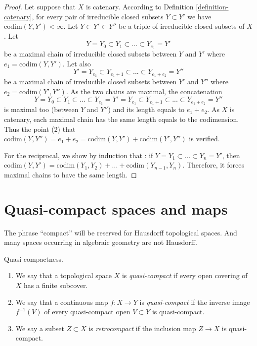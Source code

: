 \begin{proof}
Let suppose that $X$ is catenary. According to
Definition \ref{definition-catenary}, for every pair of
irreducible closed subsets $Y \subset Y'$ we have
$\text{codim}(Y,Y') < \infty$. Let $Y \subset Y' \subset Y''$
be a triple of irreducible closed subsets of $X$. Let
$$
Y = Y_0 \subset Y_1 \subset ... \subset Y_{e_1} = Y'
$$
be a maximal chain of irreducible closed subsets between $Y$ and $Y'$
where $e_1 = \text{codim}(Y,Y')$. Let also
$$
Y' = Y_{e_1} \subset Y_{e_1 + 1}\subset ... \subset Y_{e_1 + e_2} = Y''
$$
be a maximal chain of irreducible closed subsets between $Y'$
and $Y''$ where $e_2 = \text{codim}(Y',Y'')$.
As the two chains are maximal, the concatenation
$$
Y = Y_0\subset Y_1 \subset ... \subset Y_{e_1} = Y' =
Y_{e_1} \subset Y_{e_1+1}\subset ... \subset Y_{e_1+e_2}=Y''
$$
is maximal too (between $Y$ and $Y''$) and its length equals to $e_1 + e_2$.
As $X$ is catenary, each maximal chain has the same length equals to the
codimension. Thus the point (2) that
$\text{codim}(Y,Y'') = e_1 + e_2 = \text{codim}(Y,Y') + \text{codim}(Y',Y'')$
is verified.

\medskip\noindent
For the reciprocal, we show by induction that : if $Y = Y_1 \subset ... \subset
Y_n = Y'$, then $ \text{codim}(Y,Y') = \text{codim}(Y_1,Y_2) + ... +
\text{codim}(Y_{n-1},Y_n)$. Therefore, it forces maximal chains to have the
same length.
\end{proof}







\section{Quasi-compact spaces and maps}
\label{section-quasi-compact}

\noindent
The phrase ``compact'' will be reserved
for Hausdorff topological spaces. And many spaces occurring
in algebraic geometry are not Hausdorff.

\begin{definition}
\label{definition-quasi-compact}
Quasi-compactness.
\begin{enumerate}
\item We say that a topological space $X$ is {\it quasi-compact}
if every open covering of $X$ has a finite subcover.
\item We say that a continuous map $f : X \to Y$ is {\it quasi-compact}
if the inverse image $f^{-1}(V)$ of every quasi-compact open $V \subset Y$
is quasi-compact.
\item We say a subset $Z \subset X$ is {\it retrocompact}
if the inclusion map $Z \to X$ is quasi-compact.
\end{enumerate}
\end{definition}

